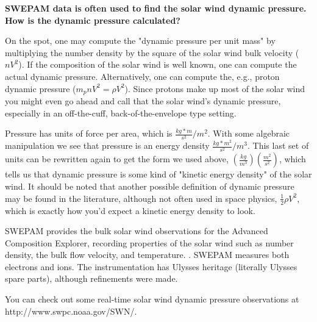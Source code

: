 \textbf{SWEPAM data is often used to find the solar wind dynamic pressure. How is the dynamic pressure calculated?}

On the spot, one may compute the "dynamic pressure per unit mass" by multiplying the number density by the
square of the solar wind bulk velocity ($n V^{2}$).
If the composition of the solar wind is
well known, one can compute the actual dynamic pressure. Alternatively,
one can compute the, e.g., proton dynamic pressure ($m_{p} n V^{2} =
\rho V^{2}$). Since protons make
up most of the solar wind you might even go ahead and call that the
solar wind's dynamic pressure, especially in an off-the-cuff,
back-of-the-envelope type setting.

Pressure has units of force per area, which is \begin{math}
\frac{kg*m}{s^{2}}/m^{2} \end{math}. With some algebraic manipulation we
see that pressure is an
energy density 
\begin{math} \frac{kg*m^{2}}{s^{2}}/m^{3} \end{math}. This last set of
  units can be rewritten again to get the form we used above,
  $(\frac{kg}{m^{3}})(\frac{m^{2}}{s^{2}})$, which tells us that dynamic
  pressure is some kind of "kinetic energy density" of the solar wind. It should be noted that another possible definition of dynamic pressure
may be found in the literature, although not often used in space
physics, $\frac{1}{2} \rho V^{2}$, which is exactly how you'd expect a
kinetic energy density to look.


SWEPAM provides the bulk solar wind observations for the Advanced
Composition Explorer, recording properties of the solar wind such
as number density, the bulk flow velocity, and temperature. \citep{McComas1998}.
SWEPAM measures both electrons and ions. The instrumentation has Ulysses
heritage (literally Ulysses spare parts), although refinements were
made. 

You can check out some real-time solar wind dynamic pressure
observations at http://www.swpc.noaa.gov/SWN/. 
